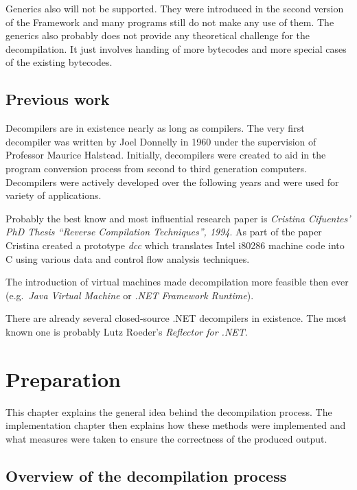 \documentclass[12pt,twoside,notitlepage]{report}
\begin{document}
Generics also will not be supported.  They were introduced in the
second version of the Framework and many programs still do not make any
use of them.  The generics also probably does not provide any
theoretical challenge for the decompilation.  It just involves handing
of more bytecodes and more special cases of the existing bytecodes.

\section{Previous work}

Decompilers are in existence nearly as long as compilers.
The very first decompiler was written by Joel Donnelly in 1960 
under the supervision of Professor Maurice Halstead.
Initially, decompilers were created to aid in the program 
conversion process from second to third generation computers.
Decompilers were actively developed over the following
years and were used for variety of applications.

Probably the best know and most influential research paper
is \emph{Cristina Cifuentes' PhD Thesis ``Reverse Compilation 
Techniques'', 1994}.  As part of the paper Cristina
created a prototype \emph{dcc} which translates Intel i80286
machine code into C using various data and control flow
analysis techniques.

The introduction of virtual machines made decompilation
more feasible then ever (e.g.\ \emph{Java Virtual Machine} or
\emph{.NET Framework Runtime}).

There are already several closed-source .NET decompilers
in existence.  The most known one is probably
Lutz Roeder's \emph{Reflector for .NET}.


\cleardoublepage
\chapter{Preparation}

This chapter explains the general idea behind the decompilation
process.  The implementation chapter then explains how these
methods were implemented and what measures were taken
to ensure the correctness of the produced output.

\section{Overview of the decompilation process}
\end{document}
